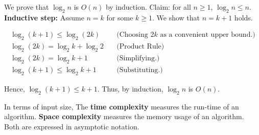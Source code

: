 \newpage 

\begin{Proof}[$O(logn)=O(n)$]

    \label{proof:logn}
    We prove that $\log_2 n$ is $O(n)$ by induction. Claim: for all $n\geq 1$, $\log_2 n \leq n$.\\
      \textbf{Inductive step:} Assume $n = k$ for some $k\geq 1$. We show that $n = k+1$ holds.

        \vspace{-1em}
        \begin{align*}
            \log_2(k+1) \leq \log_2(2k) &\quad \text{(Choosing $2k$ as a convenient upper bound.)}\\
            \log_2(2k) = \log_2 k + \log_2 2 &\quad \text{(Product Rule)}\\
            \log_2(2k) = \log_2 k + 1 &\quad \text{(Simplifying.)}\\
            \log_2(k+1) \leq \log_2 k + 1 &\quad \text{(Substituting.)}
        \end{align*}
        
        \noindent
        Hence, $\log_2(k+1) \leq k+1$. Thus, by induction, $\log_2 n$ is $O(n)$.
\end{Proof}

\begin{Def}
    
        In terms of input size, The \textbf{time complexity} measures the run-time of an algorithm.
        \textbf{Space complexity} measures the memory usage of an algorithm. Both are expressed in asymptotic notation.
\end{Def}

